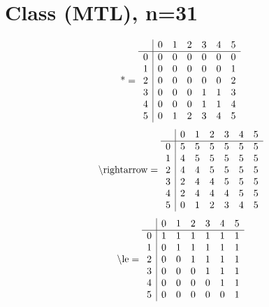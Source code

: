 \documentclass[11pt]{article}
\begin{document}
\section{Class (MTL), n=31}
\[\text{*} = 
\begin{array}{r | r r r r r r}
 & 0 & 1 & 2 & 3 & 4 & 5 \\ \hline
0 & 0 & 0 & 0 & 0 & 0 & 0 \\
1 & 0 & 0 & 0 & 0 & 0 & 1 \\
2 & 0 & 0 & 0 & 0 & 0 & 2 \\
3 & 0 & 0 & 0 & 1 & 1 & 3 \\
4 & 0 & 0 & 0 & 1 & 1 & 4 \\
5 & 0 & 1 & 2 & 3 & 4 & 5 \\
\end{array}
\]
\[\text{\textbackslash rightarrow} = 
\begin{array}{r | r r r r r r}
 & 0 & 1 & 2 & 3 & 4 & 5 \\ \hline
0 & 5 & 5 & 5 & 5 & 5 & 5 \\
1 & 4 & 5 & 5 & 5 & 5 & 5 \\
2 & 4 & 4 & 5 & 5 & 5 & 5 \\
3 & 2 & 4 & 4 & 5 & 5 & 5 \\
4 & 2 & 4 & 4 & 4 & 5 & 5 \\
5 & 0 & 1 & 2 & 3 & 4 & 5 \\
\end{array}
\]
\[\text{\textbackslash le} = 
\begin{array}{r | r r r r r r}
 & 0 & 1 & 2 & 3 & 4 & 5 \\ \hline
0 & 1 & 1 & 1 & 1 & 1 & 1 \\
1 & 0 & 1 & 1 & 1 & 1 & 1 \\
2 & 0 & 0 & 1 & 1 & 1 & 1 \\
3 & 0 & 0 & 0 & 1 & 1 & 1 \\
4 & 0 & 0 & 0 & 0 & 1 & 1 \\
5 & 0 & 0 & 0 & 0 & 0 & 1 \\
\end{array}
\]
\end{document}
